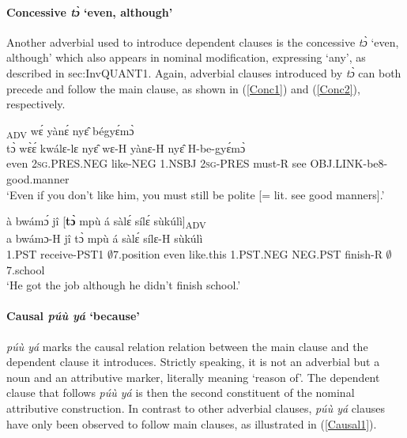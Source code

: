 \paragraph{Concessive {\itshape tɔ̀} `even, although'}
Another adverbial used to introduce dependent clauses is the concessive {\itshape tɔ̀} `even, although' which also appears in nominal modification, expressing `any', as described in {sec:InvQUANT1}. Again, adverbial clauses introduced by {\itshape tɔ̀} can both precede and follow the main clause, as shown in (\ref{Conc1}) and (\ref{Conc2}), respectively.

\begin{exe}
\ex\label{Conc1}
  \textsubscript{ADV} wɛ́ yànɛ́ nyɛ̂ bégyɛ́mɔ̀ \\
         tɔ̀ wɛ̀ɛ́ kwálɛ-lɛ nyɛ̂ wɛ-H yànɛ-H nyɛ̂ H-be-gyɛ́mɔ̀ \\
        even 2\textsc{sg}.PRES.NEG like-NEG 1.NSBJ 2\textsc{sg}-PRES must-R see OBJ.LINK-be8-good.manner \\ 
    \trans `Even if you don't like him, you must still be polite [= lit. see good manners].'
\end{exe}


\begin{exe}
\ex\label{Conc2}
  \glll à bwámɔ́ jî [{\bfseries tɔ̀} mpù á sàlɛ́ sílɛ́ sùkúlì]\textsubscript{ADV} \\
         a bwámɔ-H jî tɔ̀ mpù á sàlɛ́ sílɛ-H sùkúlì \\
        1.PST receive-PST1 $\emptyset$7.position even like.this 1.PST.NEG NEG.PST finish-R $\emptyset$7.school \\ 
    \trans `He got the job although he didn't finish school.'
\end{exe}



\paragraph{Causal {\itshape púù yá} `because'}

{\itshape púù yá} marks the causal relation relation between the main clause and the dependent clause it introduces. Strictly speaking, it is not an adverbial but a noun and an attributive marker, literally meaning `reason of'. The dependent clause that follows {\itshape púù yá} is then the second constituent of the nominal attributive construction. In contrast to other adverbial clauses, {\itshape púù yá} clauses have only been observed to follow main clauses, as illustrated in (\ref{Causal1}).

